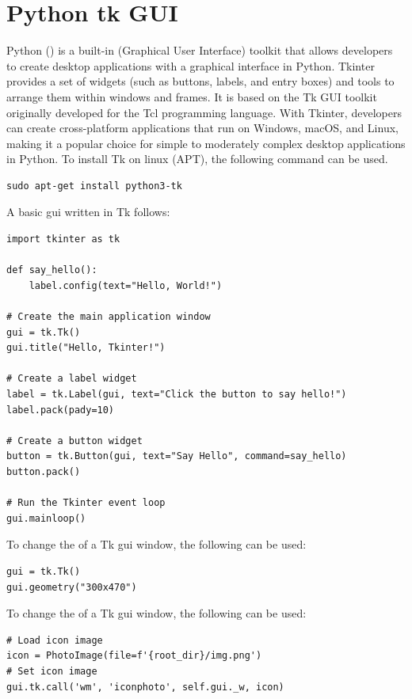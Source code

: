 \section{Python tk GUI}

Python  () is a built-in  (Graphical User Interface) toolkit that allows developers to create desktop applications with a graphical interface in Python. Tkinter provides a set of widgets (such as buttons, labels, and entry boxes) and tools to arrange them within windows and frames. It is based on the Tk GUI toolkit originally developed for the Tcl programming language. With Tkinter, developers can create cross-platform applications that run on Windows, macOS, and Linux, making it a popular choice for simple to moderately complex desktop applications in Python. To install Tk on linux (APT), the following command can be used.

\begin{lstlisting}[style=terminalstyle]
sudo apt-get install python3-tk
\end{lstlisting}

A basic  gui written in Tk follows:

\begin{lstlisting}
import tkinter as tk

def say_hello():
    label.config(text="Hello, World!")

# Create the main application window
gui = tk.Tk()
gui.title("Hello, Tkinter!")

# Create a label widget
label = tk.Label(gui, text="Click the button to say hello!")
label.pack(pady=10)

# Create a button widget
button = tk.Button(gui, text="Say Hello", command=say_hello)
button.pack()

# Run the Tkinter event loop
gui.mainloop()
\end{lstlisting}

To change the  of a Tk gui window, the following can be used:

\begin{lstlisting}
gui = tk.Tk()
gui.geometry("300x470")
\end{lstlisting}

To change the  of a Tk gui window, the following can be used:

\begin{lstlisting}
# Load icon image
icon = PhotoImage(file=f'{root_dir}/img.png')
# Set icon image
gui.tk.call('wm', 'iconphoto', self.gui._w, icon)
\end{lstlisting}






